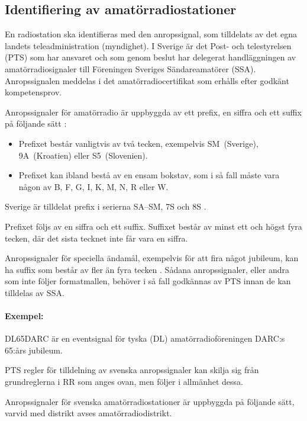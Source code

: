 \subsection{Identifiering av amatörradiostationer}

En radiostation ska identifieras med den anropssignal, som tilldelats av det
egna landets teleadministration (myndighet).
I Sverige är det Post- och telestyrelsen (PTS) som har ansvaret och som genom
beslut har delegerat handläggningen av amatörradiosignaler till Föreningen
Sveriges Sändareamatörer (SSA).
Anropssignalen meddelas i det amatörradiocertifikat som erhålls efter godkänt
kompetensprov.

Anropssignaler för amatörradio är uppbyggda av ett prefix, en siffra och ett
suffix på följande sätt \cite[\S19.68, \S19.69]{ITU-RR}:

\begin{itemize}
\item Prefixet består vanligtvis av två tecken, exempelvis SM~(Sverige), 9A~(Kroatien)
eller S5~(Slovenien).
\item Prefixet kan ibland bestå av en ensam bokstav, som i så fall måste vara någon
av B, F, G, I, K, M, N, R eller W.
\end{itemize}

Sverige är tilldelat prefix i serierna SA--SM, 7S och 8S
\cite[Appendix 42]{ITU-RR}.

Prefixet följs av en siffra och ett suffix. Suffixet består av minst ett och
högst fyra tecken, där det sista tecknet inte får vara en siffra.

Anropssignaler för speciella ändamål, exempelvis för att fira något jubileum,
kan ha suffix som består av fler än fyra tecken \cite[\S19.68A]{ITU-RR}.
Sådana anropssignaler, eller andra som inte följer formatmallen, behöver i så
fall godkännas av PTS innan de kan tilldelas av SSA.

\paragraph{Exempel:} DL65DARC är en eventsignal för tyska (DL)
amatörradioföreningen DARC:s 65:års jubileum.

PTS regler för tilldelning av svenska anropssignaler kan skilja sig från
grundreglerna i RR som anges ovan, men följer i allmänhet dessa.

Anropssignaler för svenska amatörradiostationer är uppbyggda på följande
sätt, varvid med distrikt avses amatörradiodistrikt.

